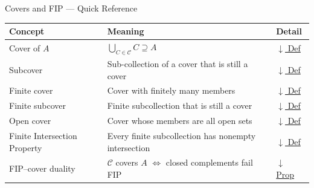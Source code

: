 \begin{toolkitbox}{Covers and FIP --- Quick Reference}
\small
\begin{tabular}{l l l}
\toprule
\textbf{Concept} & \textbf{Meaning} & \textbf{Detail} \\
\midrule
Cover of $A$     & $\bigcup_{C \in \mathcal{C}} C \supseteq A$                     & \hyperref[def:cover-full]{$\downarrow$ Def} \\
Subcover         & Sub-collection of a cover that is still a cover                 & \hyperref[def:subcover]{$\downarrow$ Def} \\
Finite cover     & Cover with finitely many members                                & \hyperref[def:finite-cover]{$\downarrow$ Def} \\
Finite subcover  & Finite subcollection that is still a cover                      & \hyperref[def:subcover]{$\downarrow$ Def} \\
Open cover       & Cover whose members are all open sets                           & \hyperref[def:open-cover]{$\downarrow$ Def} \\
Finite Intersection Property & Every finite subcollection has nonempty intersection & \hyperref[def:fip]{$\downarrow$ Def} \\
FIP--cover duality & $\mathcal{C}$ covers $A$ $\iff$ closed complements fail FIP   & \hyperref[prop:fip-duality]{$\downarrow$ Prop} \\
\bottomrule
\end{tabular}
\end{toolkitbox}


